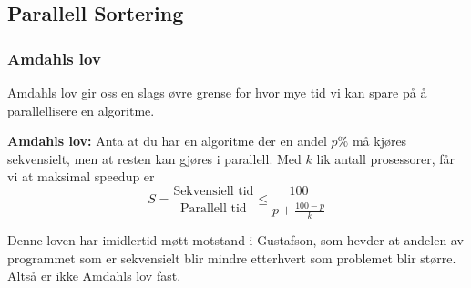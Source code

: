 \subsection{Parallell Sortering}

\subsubsection{Amdahls lov}
\label{sec:amdahl}

Amdahls lov gir oss en slags øvre grense for hvor mye tid vi kan spare på å
parallellisere en algoritme.
\begin{theorem}\textbf{Amdahls lov: } 
  Anta at du har en algoritme der en andel
  $p\%$ må kjøres sekvensielt, men at resten kan gjøres i parallell.
  Med $k$ lik antall prosessorer, får vi at maksimal speedup er
  \[
    S = \frac{\text{Sekvensiell tid}}{\text{Parallell tid}} \leq \frac{100}{p + \frac{100 - p}{k}}
  \]
\end{theorem}

Denne loven har imidlertid møtt motstand i Gustafson, som hevder at andelen av
programmet som er sekvensielt blir mindre etterhvert som problemet blir større.
Altså er ikke Amdahls lov fast.

